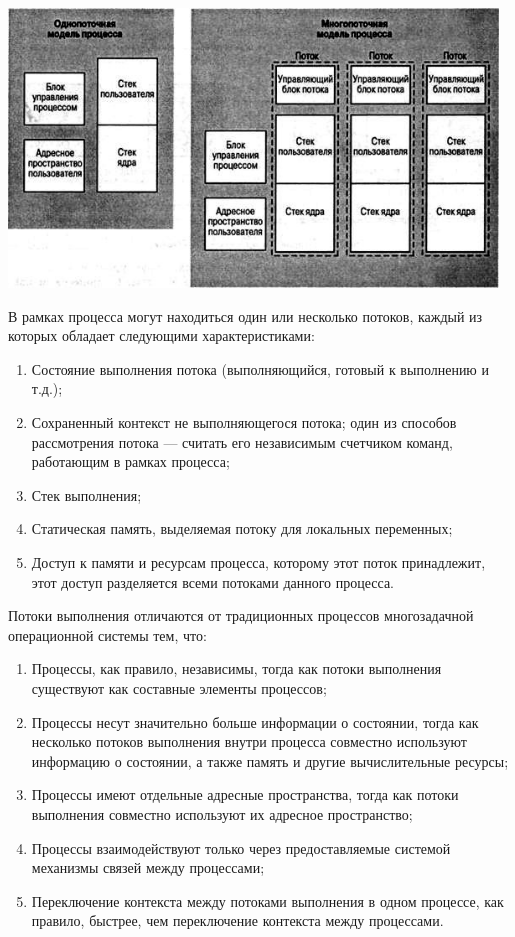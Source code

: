 \documentclass[a4paper]{article}
\begin{document}
\begin{center}
  \includegraphics[width = 13cm]{2.jpg}
\end{center}
\noindent
В рамках процесса могут находиться один или несколько потоков, каждый из которых обладает следующими характеристиками:
\begin{enumerate}
  \item Состояние выполнения потока (выполняющийся, готовый к выполнению и т.д.);
  \item Сохраненный контекст не выполняющегося потока; один из способов рассмотрения потока — считать его независимым счетчиком команд, работающим в рамках процесса;
  \item Стек выполнения;
  \item Статическая память, выделяемая потоку для локальных переменных;
  \item Доступ к памяти и ресурсам процесса, которому этот поток принадлежит, этот доступ разделяется всеми потоками данного процесса.
\end{enumerate}
\vspace{1cm}
Потоки выполнения отличаются от традиционных процессов многозадачной операционной системы тем, что:
\begin{enumerate}
  \item Процессы, как правило, независимы, тогда как потоки выполнения существуют как составные элементы процессов;
  \item Процессы несут значительно больше информации о состоянии, тогда как несколько потоков выполнения внутри процесса совместно используют информацию о состоянии, а также память и другие вычислительные ресурсы;
  \item Процессы имеют отдельные адресные пространства, тогда как потоки выполнения совместно используют их адресное пространство;
  \item Процессы взаимодействуют только через предоставляемые системой механизмы связей между процессами;
  \item Переключение контекста между потоками выполнения в одном процессе, как правило, быстрее, чем переключение контекста между процессами.
\end{enumerate}
\end{document}
